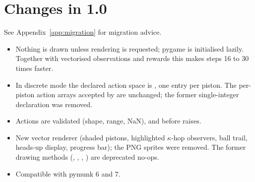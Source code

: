 \section{Changes in 1.0}\label{sec:pistonball-changes}

See Appendix~\ref{app:migration} for migration advice.

\begin{itemize}
  \item Nothing is drawn unless rendering is requested; pygame is initialised
        lazily. Together with vectorised observations and rewards this makes
        steps 16 to 30 times faster.
  \item In discrete mode the declared action space is
        , one entry per piston. The per-piston
        action arrays accepted by  are unchanged; the former
        single-integer  declaration was removed.
  \item Actions are validated (shape, range, NaN), and  before
         raises.
  \item New vector renderer (shaded pistons, highlighted $\kappa$-hop
        observers, ball trail, heads-up display, progress bar); the PNG sprites
        were removed. The former drawing methods (,
        , ,
        ) are deprecated no-ops.
  \item Compatible with pymunk 6 and 7.
\end{itemize}

\endgroup
